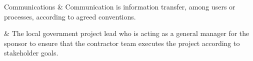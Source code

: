 
Communications		&	\KNEADglossaryEntryStart
{
Communication is information transfer, among users or processes, according to agreed conventions.
}\KNEADglossaryEntryClose

\Customer         & \KNEADglossaryEntryStart
{
The local government project lead who is acting as a general manager for the sponsor to ensure that the contractor team executes the project according to stakeholder goals.
}\KNEADglossaryEntryCloseLast

